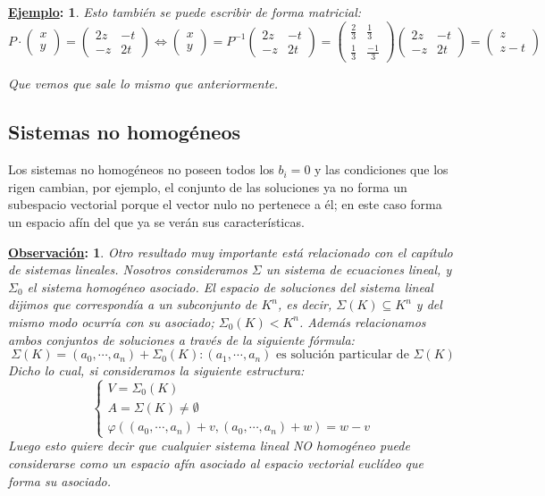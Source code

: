 \documentclass[10pt,a4paper,openright]{book}
\theoremstyle{break}
\newtheorem*{obs}{\underline{Observación}:}
\newtheorem*{ej}{\underline{Ejemplo}:}
\begin{document}
\begin{ej}
Esto también se puede escribir de forma matricial:
$$P\cdot \begin{pmatrix} x \\ y\end{pmatrix}=\begin{pmatrix} 2z & -t \\ -z & 2t \end{pmatrix}\Leftrightarrow \begin{pmatrix} x \\ y\end{pmatrix}=P^{-1}\begin{pmatrix} 2z & -t \\ -z & 2t \end{pmatrix}= \begin{pmatrix} \frac{2}{3} & \frac{1}{3} \\ \frac{1}{3}& \frac{-1}{3}\end{pmatrix}\begin{pmatrix} 2z & -t \\ -z & 2t \end{pmatrix}= \begin{pmatrix}
z \\ z-t
\end{pmatrix}$$

Que vemos que sale lo mismo que anteriormente.
\end{ej}

\subsection{Sistemas no homogéneos}
Los sistemas no homogéneos no poseen todos los $b_i=0$ y las condiciones que los rigen cambian, por ejemplo, el conjunto de las soluciones ya no forma un subespacio vectorial porque el vector nulo no pertenece a él; en este caso forma un espacio afín del que ya se verán sus características.

\begin{obs}
Otro resultado muy importante está relacionado con el capítulo de sistemas lineales. Nosotros consideramos $\Sigma $ un sistema de ecuaciones lineal, y $\Sigma_0$ el sistema homogéneo asociado. El espacio de soluciones del sistema lineal dijimos que correspondía a un subconjunto de $K^n$, es decir, $\Sigma(K) \subseteq K^n$ y del mismo modo ocurría con su asociado; $\Sigma_0 (K) < K^n$. Además relacionamos ambos conjuntos de soluciones a través de la siguiente fórmula:
$$\Sigma(K) = (a_0, \cdots , a_n) + \Sigma_0(K): (a_1, \cdots, a_n)\mbox{ es solución particular de }\Sigma(K)$$
Dicho lo cual, si consideramos la siguiente estructura:
$$\begin{cases} V = \Sigma_0(K) \\ A = \Sigma(K)\neq \emptyset \\ \varphi((a_0, \cdots, a_n)+v, (a_0, \cdots, a_n)+ w) = w-v\end{cases}$$
Luego esto quiere decir que cualquier sistema lineal NO homogéneo puede considerarse como un espacio afín asociado al espacio vectorial euclídeo que forma su asociado.
\end{obs}
\end{document}
